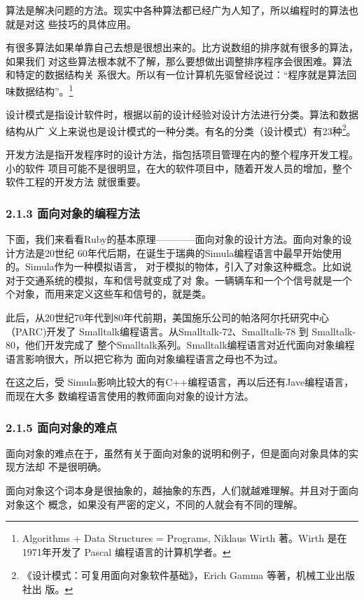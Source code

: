 \documentclass[11pt]{ctexart}
\begin{document}
算法是解决问题的方法。现实中各种算法都已经广为人知了，所以编程时的算法也就是对这
些技巧的具体应用。

有很多算法如果单靠自己去想是很想出来的。比方说数组的排序就有很多的算法，如果我们
对这些算法根本就不了解，那么要想做出调整排序程序会很困难。算法和特定的数据结构关
系很大。所以有一位计算机先驱曾经说过：“程序就是算法回味数据结构”。\footnote{Algorithms + Data Structures = Programs, Niklaus Wirth 著。Wirth 是在
1971年开发了 Pascal 编程语言的计算机学者。}

设计模式是指设计软件时，根据以前的设计经验对设计方法进行分类。算法和数据结构从广
义上来说也是设计模式的一种分类。有名的分类（设计模式）有23种\footnote{《设计模式：可复用面向对象软件基础》，Erich Gamma 等著，机械工业出版社出
版。}。

开发方法是指开发程序时的设计方法，指包括项目管理在内的整个程序开发工程。小的软件
项目可能不是很明显，在大的软件项目中，随着开发人员的增加，整个软件工程的开发方法
就很重要。

\subsubsection{2.1.3 面向对象的编程方法}
\label{sec:orgheadline12}

下面，我们来看看Ruby的基本原理————面向对象的设计方法。面向对象的设计方法是20世纪
60年代后期，在诞生于瑞典的Simula编程语言中最早开始使用的。Simula作为一种模拟语言，
对于模拟的物体，引入了对象这种概念。比如说对于交通系统的模拟，车和信号就变成了对
象。一辆辆车和一个个信号就是一个个对象，而用来定义这些车和信号的，就是类。

此后，从20世纪70年代到80年代前期，美国施乐公司的帕洛阿尔托研究中心（PARC)开发了
Smalltalk编程语言。从Smalltalk-72、Smalltalk-78 到 Smalltalk-80，他们开发完成了
整个Smalltalk系列。Smalltalk编程语言对近代面向对象编程语言影响很大，所以把它称为
面向对象编程语言之母也不为过。

在这之后，受 Simula影响比较大的有C++编程语言，再以后还有Jave编程语言，而现在大多
数编程语言使用的教师面向对象的设计方法。

\subsubsection{2.1.5 面向对象的难点}
\label{sec:orgheadline13}

面向对象的难点在于，虽然有关于面向对象的说明和例子，但是面向对象具体的实现方法却
不是很明确。

面向对象这个词本身是很抽象的，越抽象的东西，人们就越难理解。并且对于面向对象这个
概念，如果没有严密的定义，不同的人就会有不同的理解。
\end{document}
